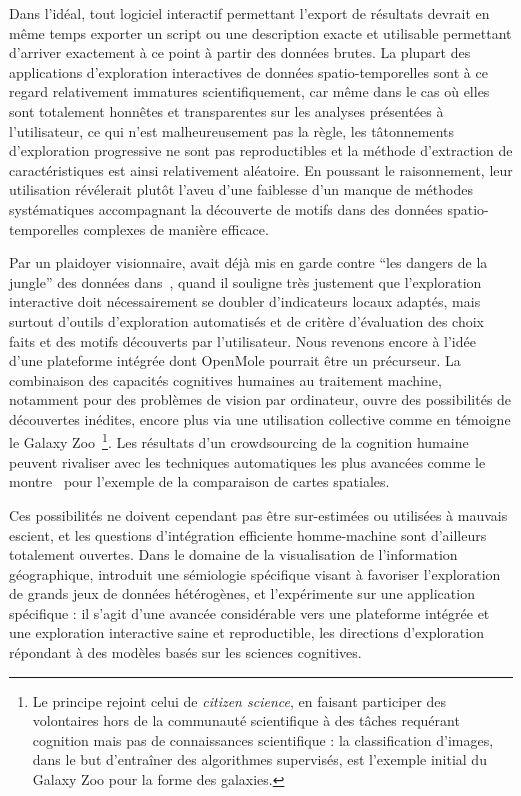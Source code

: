 Dans l'idéal, tout logiciel interactif permettant l'export de résultats devrait en même temps exporter un script ou une description exacte et utilisable permettant d'arriver exactement à ce point à partir des données brutes. La plupart des applications d'exploration interactives de données spatio-temporelles sont à ce regard relativement immatures scientifiquement, car même dans le cas où elles sont totalement honnêtes et transparentes sur les analyses présentées à l'utilisateur, ce qui n'est malheureusement pas la règle, les tâtonnements d'exploration progressive ne sont pas reproductibles et la méthode d'extraction de caractéristiques est ainsi relativement aléatoire. En poussant le raisonnement, leur utilisation révélerait plutôt l'aveu d'une faiblesse d'un manque de méthodes systématiques accompagnant la découverte de motifs dans des données spatio-temporelles complexes de manière efficace.

Par un plaidoyer visionnaire,  avait déjà mis en garde contre ``les dangers de la jungle'' des données dans~\cite{banos2001propos}, quand il souligne très justement que l'exploration interactive doit nécessairement se doubler d'indicateurs locaux adaptés, mais surtout d'outils d'exploration automatisés et de critère d'évaluation des choix faits et des motifs découverts par l'utilisateur. Nous revenons encore à l'idée d'une plateforme intégrée dont OpenMole pourrait être un précurseur. La combinaison des capacités cognitives humaines au traitement machine, notamment pour des problèmes de vision par ordinateur, ouvre des possibilités de découvertes inédites, encore plus via une utilisation collective comme en témoigne le Galaxy Zoo~\cite{2010AEdRv...9a0103R}\footnote{Le principe rejoint celui de \emph{citizen science}, en faisant participer des volontaires hors de la communauté scientifique à des tâches requérant cognition mais pas de connaissances scientifique : la classification d'images, dans le but d'entraîner des algorithmes supervisés, est l'exemple initial du Galaxy Zoo pour la forme des galaxies.}. Les résultats d'un crowdsourcing de la cognition humaine peuvent rivaliser avec les techniques automatiques les plus avancées comme le montre~\cite{10.1371/journal.pone.0178165} pour l'exemple de la comparaison de cartes spatiales.


Ces possibilités ne doivent cependant pas être sur-estimées ou utilisées à mauvais escient, et les questions d'intégration efficiente homme-machine sont d'ailleurs totalement ouvertes. Dans le domaine de la visualisation de l'information géographique, \cite{pfaender2009spatialisation} introduit une sémiologie spécifique visant à favoriser l'exploration de grands jeux de données hétérogènes, et l'expérimente sur une application spécifique : il s'agit d'une avancée considérable vers une plateforme intégrée et une exploration interactive saine et reproductible, les directions d'exploration répondant à des modèles basés sur les sciences cognitives. 


